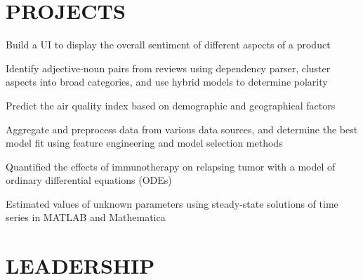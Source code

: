 \documentclass[]{deedy-resume-openfont}
\begin{document}
\begin{minipage}[t]{0.66\textwidth}
\begin{tightemize}
\end{tightemize}
\sectionsep


\section{PROJECTS}
\begin{tightemize}
\item Build a UI to display the overall sentiment of different aspects of a product
\item Identify adjective-noun pairs from reviews using dependency parser, cluster aspects into broad categories, and use hybrid models to determine polarity
\end{tightemize}
\sectionsep

\begin{tightemize}
\item Predict the air quality index based on demographic and geographical factors
\item Aggregate and preprocess data from various data sources, and determine the best model fit using feature engineering and model selection methods
\end{tightemize}
\sectionsep

\begin{tightemize}
\item Quantified the effects of immunotherapy on relapsing tumor with a model of ordinary differential equations (ODEs) 
\item Estimated values of unknown parameters using steady-state solutions of time series in MATLAB and Mathematica
\end{tightemize}
\sectionsep


\section{LEADERSHIP} 


\end{minipage}
\end{document}
